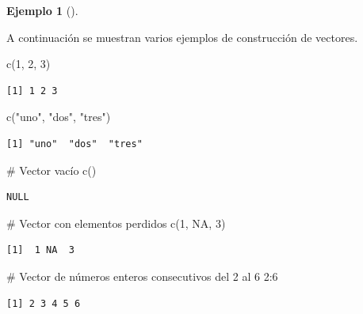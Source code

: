 \documentclass[
  a4paper,
]{scrreport}
\newenvironment{Shaded}{\begin{snugshade}}{\end{snugshade}}
\newcommand{\CommentTok}[1]{\textcolor[rgb]{0.37,0.37,0.37}{#1}}
\newcommand{\ConstantTok}[1]{\textcolor[rgb]{0.56,0.35,0.01}{#1}}
\newcommand{\DecValTok}[1]{\textcolor[rgb]{0.68,0.00,0.00}{#1}}
\newcommand{\FunctionTok}[1]{\textcolor[rgb]{0.28,0.35,0.67}{#1}}
\newcommand{\NormalTok}[1]{\textcolor[rgb]{0.00,0.23,0.31}{#1}}
\newcommand{\SpecialCharTok}[1]{\textcolor[rgb]{0.37,0.37,0.37}{#1}}
\newcommand{\StringTok}[1]{\textcolor[rgb]{0.13,0.47,0.30}{#1}}
\theoremstyle{definition}
\theoremstyle{definition}
\newtheorem{example}{Ejemplo}[chapter]
\theoremstyle{remark}
\begin{document}
\leavevmode{}%
\begin{example}[]\label{exm-construccion-vectores}

A continuación se muestran varios ejemplos de construcción de vectores.

\begin{Shaded}
\begin{Highlighting}[]
\FunctionTok{c}\NormalTok{(}\DecValTok{1}\NormalTok{, }\DecValTok{2}\NormalTok{, }\DecValTok{3}\NormalTok{)}
\end{Highlighting}
\end{Shaded}

\begin{verbatim}
[1] 1 2 3
\end{verbatim}

\begin{Shaded}
\begin{Highlighting}[]
\FunctionTok{c}\NormalTok{(}\StringTok{"uno"}\NormalTok{, }\StringTok{"dos"}\NormalTok{, }\StringTok{"tres"}\NormalTok{)}
\end{Highlighting}
\end{Shaded}

\begin{verbatim}
[1] "uno"  "dos"  "tres"
\end{verbatim}

\begin{Shaded}
\begin{Highlighting}[]
\CommentTok{\# Vector vacío}
\FunctionTok{c}\NormalTok{()}
\end{Highlighting}
\end{Shaded}

\begin{verbatim}
NULL
\end{verbatim}

\begin{Shaded}
\begin{Highlighting}[]
\CommentTok{\# Vector con elementos perdidos}
\FunctionTok{c}\NormalTok{(}\DecValTok{1}\NormalTok{, }\ConstantTok{NA}\NormalTok{, }\DecValTok{3}\NormalTok{)}
\end{Highlighting}
\end{Shaded}

\begin{verbatim}
[1]  1 NA  3
\end{verbatim}

\begin{Shaded}
\begin{Highlighting}[]
\CommentTok{\# Vector de números enteros consecutivos del 2 al 6}
\DecValTok{2}\SpecialCharTok{:}\DecValTok{6}
\end{Highlighting}
\end{Shaded}

\begin{verbatim}
[1] 2 3 4 5 6
\end{verbatim}

\end{example}
\end{document}
